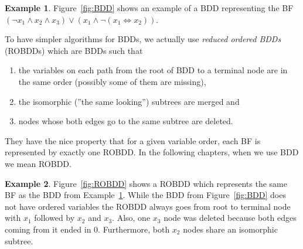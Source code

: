 \documentclass[
  digital, %
  twoside, %
  table,   %
  nolof,     %
  nolot,     %
]{fithesis3}
\theoremstyle{definition}
\newtheorem{example}{Example}
\theoremstyle{remark}
\newcommand{\lequal}{\Leftrightarrow}
\begin{document}
\begin{example}
\label{ex:BDD}
Figure~\ref{fig:BDD} shows an example of a BDD representing the BF $(\neg x_1 \land x_2 \land x_3) \lor (x_1 \land \neg (x_1 \lequal x_2))$. 
\end{example}

To have simpler algorithms for BDDs, we actually use \emph{reduced ordered BDDs} (ROBDDs) which are BDDs such that 
\begin{enumerate}
    \item the variables on each path from the root of BDD to a terminal node are in the same order (possibly some of them are missing),
    \item the isomorphic (''the same looking'') subtrees are merged and
    \item nodes whose both edges go to the same subtree are deleted.
\end{enumerate}
They have the nice property that for a given variable order, each BF is represented by exactly one ROBDD. In the following chapters, when we use BDD we mean ROBDD.

\begin{example}
\label{ex:ROBDD}
Figure~\ref{fig:ROBDD} shows a ROBDD which represents the same BF as the BDD from Example~\ref{ex:BDD}. While the BDD from Figure~\ref{fig:BDD} does not have ordered variables the ROBDD always goes from root to terminal node with $x_1$ followed by $x_2$ and $x_3$. Also, one $x_3$ node was deleted because both edges coming from it ended in $0$. Furthermore, both $x_2$ nodes share an isomorphic subtree.
\end{example}




\end{document}

